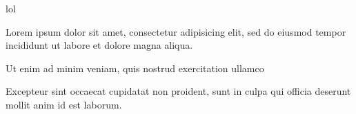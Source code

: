 


\nodetreeprocessoptions

\nodetreeregister lol \nodetreeunregister

Lorem ipsum dolor sit amet, consectetur adipisicing elit, sed do eiusmod
tempor incididunt ut labore et dolore magna aliqua.

Ut enim ad minim veniam,
quis nostrud exercitation ullamco

Excepteur sint occaecat cupidatat non
proident, sunt in culpa qui officia deserunt mollit anim id est laborum.

\bye

